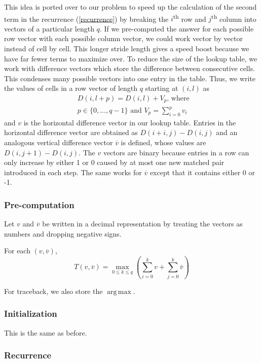 \documentclass[journal]{IEEEtran}
\DeclareMathOperator*{\argmax}{arg\,max}
\begin{document}
This idea is ported over to our problem to speed up the calculation of the second term in the recurrence (\ref{recurrence}) by breaking the $i$\textsuperscript{th} row and $j$\textsuperscript{th} column into vectors of a particular length $q$. If we pre-computed the answer for each possible row vector with each possible column vector,  we could work vector by vector instead of cell by cell. This longer stride length gives a speed boost because we have far fewer terms to maximize over. To reduce the size of the lookup table, we work with difference vectors which store the difference between consecutive cells. This condenses many possible vectors into one entry in the table. Thus, we write the values of cells in a row vector of length $q$ starting at $(i,l)$ as
\[
\begin{array}{rl}

&D(i,l+p) = D(i,l) + V_p\text{, where }\\
&p\in \lbrace 0,...,q-1\rbrace\text{ and }V_p = \sum\limits_{i=0}^p v_i
\end{array}
\]
and $v$ is the horizontal difference vector in our lookup table. Entries in the horizontal difference vector are obtained as $D(i+i,j)-D(i,j)$ and an analogous vertical difference vector $\overline{v}$ is defined, whose values are $D(i,j+1)-D(i,j)$. The $v$ vectors are binary because entries in a row can only increase by either 1 or 0 caused by at most one new matched pair introduced in each step. The same works for $\overline{v}$ except that it contains either 0 or -1.

\subsubsection{Pre-computation}
Let $v$ and $\overline{v}$ be written in a decimal representation by treating the vectors as numbers and dropping negative signs.

For each $(v,\overline{v})$, 
\[
T(v,\overline{v}) = \max\limits_{0\leq k\leq q}\left(\sum\limits_{i=0}^k v + \sum\limits_{j=0}^k \overline{v}\right)
\]

For traceback, we also store the $\argmax$.

\subsubsection{Initialization}
This is the same as before.

\subsubsection{Recurrence}
\end{document}
